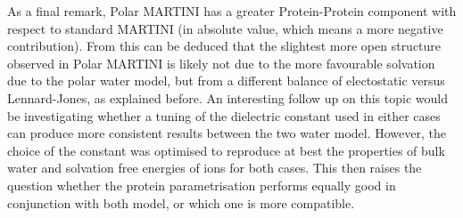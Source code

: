 As a final remark, Polar MARTINI has a greater Protein-Protein component with respect to standard MARTINI (in absolute value, which means a more negative contribution). From this can be deduced that the slightest more open structure observed in Polar MARTINI is likely not due to the more favourable solvation due to the polar water model, but from a different balance of electostatic versus Lennard-Jones, as explained before.
%
An interesting follow up on this topic would be investigating whether a tuning of the dielectric constant used in either cases can produce more consistent results between the two water model. However, the choice of the constant was optimised to reproduce at best the properties of bulk water and solvation free energies of ions for both cases. This then raises the question whether the protein parametrisation performs equally good in conjunction with both model, or which one is more compatible.


